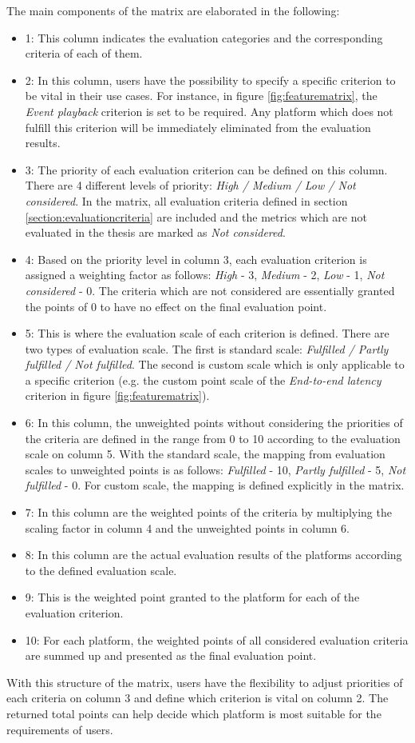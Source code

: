 The main components of the matrix are elaborated in the following:
\begin{itemize}
	\item 1: This column indicates the evaluation categories and the corresponding criteria of each of them.
	\item 2: In this column, users have the possibility to specify a specific criterion to be vital in their use cases. For instance, in figure \ref{fig:featurematrix}, the \emph{Event playback} criterion is set to be required. Any platform which does not fulfill this criterion will be immediately eliminated from the evaluation results.
	\item 3: The priority of each evaluation criterion can be defined on this column. There are 4 different levels of priority: \emph{High / Medium / Low / Not considered}. In the matrix, all evaluation criteria defined in section \ref{section:evaluationcriteria} are included and the metrics which are not evaluated in the thesis are marked as \emph{Not considered}.
	\item 4: Based on the priority level in column 3, each evaluation criterion is assigned a weighting factor as follows: \emph{High} - 3, \emph{Medium} - 2, \emph{Low} - 1, \emph{Not considered} - 0. The criteria which are not considered are essentially granted the points of 0 to have no effect on the final evaluation point.
	\item 5: This is where the evaluation scale of each criterion is defined. There are two types of evaluation scale. The first is standard scale: \emph{Fulfilled / Partly fulfilled / Not fulfilled}. The second is custom scale which is only applicable to a specific criterion (e.g. the custom point scale of the \emph{End-to-end latency} criterion in figure \ref{fig:featurematrix}). 
	\item 6: In this column, the unweighted points without considering the priorities of the criteria are defined in the range from 0 to 10 according to the evaluation scale on column 5. With the standard scale, the mapping from evaluation scales to unweighted points is as follows: \emph{Fulfilled} - 10, \emph{Partly fulfilled} - 5, \emph{Not fulfilled} - 0. For custom scale, the mapping is defined explicitly in the matrix. 
	\item 7: In this column are the weighted points of the criteria by multiplying the scaling factor in column 4 and the unweighted points in column 6.
	\item 8: In this column are the actual evaluation results of the platforms according to the defined evaluation scale.
	\item 9: This is the weighted point granted to the platform for each of the evaluation criterion.
	\item 10: For each platform, the weighted points of all considered evaluation criteria are summed up and presented as the final evaluation point.  
\end{itemize}

With this structure of the matrix, users have the flexibility to adjust priorities of each criteria on column 3 and define which criterion is vital on column 2. The returned total points can help decide which platform is most suitable for the requirements of users.